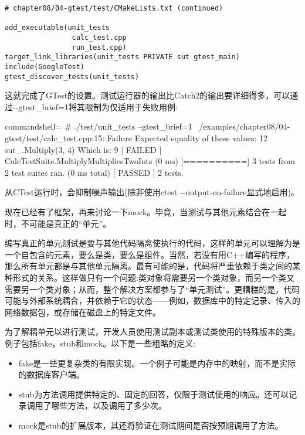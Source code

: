 \begin{lstlisting}[style=styleCMake]
# chapter08/04-gtest/test/CMakeLists.txt (continued)
	
add_executable(unit_tests
				calc_test.cpp
				run_test.cpp)
target_link_libraries(unit_tests PRIVATE sut gtest_main)
include(GoogleTest)
gtest_discover_tests(unit_tests)
\end{lstlisting}

这就完成了GTest的设置。测试运行器的输出比Catch2的输出要详细得多，可以通过-{}-gtest\_brief=1将其限制为仅适用于失败用例:

\begin{tcblisting}{commandshell={}}
# ./test/unit_tests --gtest_brief=1
~/examples/chapter08/04-gtest/test/calc_test.cpp:15: Failure
Expected equality of these values:
  12
  sut_.Multiply(3, 4)
    Which is: 9
[ FAILED ] CalcTestSuite.MultiplyMultipliesTwoInts (0 ms)
[==========] 3 tests from 2 test suites ran. (0 ms total)
[ PASSED ] 2 tests.
\end{tcblisting}

从CTest运行时，会抑制噪声输出(除非使用ctest -{}-output-on-failure显式地启用)。

现在已经有了框架，再来讨论一下mock。毕竟，当测试与其他元素结合在一起时，不可能是真正的“单元”。


编写真正的单元测试是要与其他代码隔离使执行的代码，这样的单元可以理解为是一个自包含的元素，要么是类，要么是组件。当然，若没有用C++编写的程序，那么所有单元都是与其他单元隔离。最有可能的是，代码将严重依赖于类之间的某种形式的关系。这样做只有一个问题:类对象将需要另一个类对象，而另一个类又需要另一个类对象；从而，整个解决方案都参与了“单元测试”。更糟糕的是，代码可能与外部系统耦合，并依赖于它的状态——例如，数据库中的特定记录、传入的网络数据包，或存储在磁盘上的特定文件。

为了解耦单元以进行测试，开发人员使用测试副本或测试类使用的特殊版本的类。例子包括fake，stub和mock。以下是一些粗略的定义:

\begin{itemize}
\item 
fake是一些更复杂类的有限实现。一个例子可能是内存中的映射，而不是实际的数据库客户端。

\item 
stub为方法调用提供特定的、固定的回答，仅限于测试使用的响应。还可以记录调用了哪些方法，以及调用了多少次。

\item 
mock是stub的扩展版本，其还将验证在测试期间是否按预期调用了方法。
\end{itemize}

